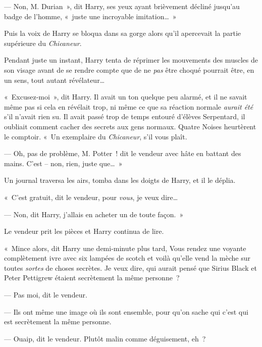 --- Non, M. Durian~», dit Harry, ses yeux ayant brièvement décliné jusqu'au badge de l'homme, «~juste une incroyable imitation…~»

Puis la voix de Harry se bloqua dans sa gorge alors qu'il apercevait la partie supérieure du \emph{Chicaneur}.

Pendant juste un instant, Harry tenta de réprimer les mouvements des muscles de son visage avant de se rendre compte que de ne \emph{pas} être choqué pourrait être, en un sens, tout autant révélateur…

«~Excusez-moi~», dit Harry.
Il avait un ton quelque peu alarmé, et il ne savait même pas si cela en révélait trop, ni même ce que sa réaction normale \emph{aurait été} s'il n'avait rien su.
Il avait passé trop de temps entouré d'élèves Serpentard, il oubliait comment cacher des secrets aux gens normaux.
Quatre Noises heurtèrent le comptoir.
«~Un exemplaire du \emph{Chicaneur}, s'il vous plaît.

--- Oh, pas de problème, M. Potter~! dit le vendeur avec hâte en battant des mains.
C'est -- non, rien, juste que…~»

Un journal traversa les airs, tomba dans les doigts de Harry, et il le déplia.


«~C'est gratuit, dit le vendeur, pour \emph{vous}, je veux dire…

--- Non, dit Harry, j'allais en acheter un de toute façon.~»

Le vendeur prit les pièces et Harry continua de lire.

«~Mince alors, dit Harry une demi-minute plus tard, Vous rendez une voyante complètement ivre avec six lampées de scotch et voilà qu'elle vend la mèche sur toutes \emph{sortes} de choses secrètes.
Je veux dire, qui aurait pensé que Sirius Black et Peter Pettigrew étaient secrètement la même personne~?

--- Pas moi, dit le vendeur.

--- Ils ont même une image où ils sont ensemble, pour qu'on sache qui c'est qui est secrètement la même personne.

--- Ouaip, dit le vendeur.
Plutôt malin comme déguisement, eh~?

